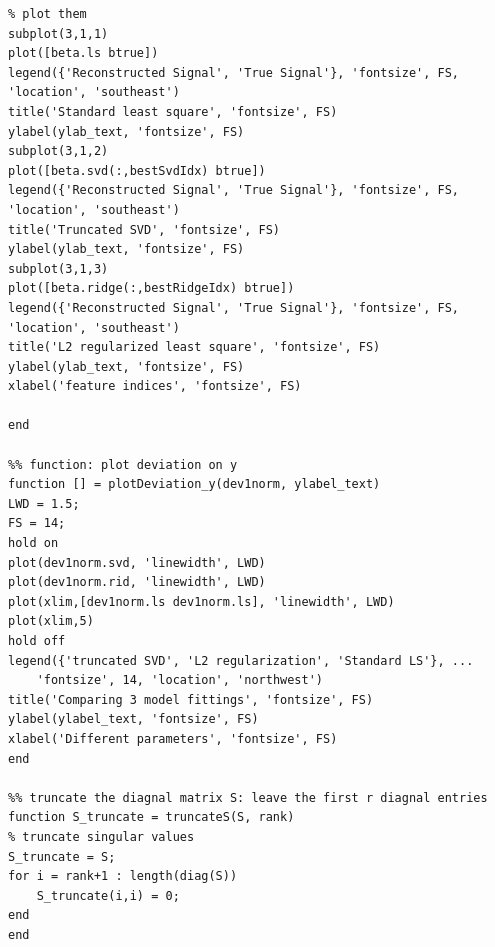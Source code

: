 \documentclass[paper=a4, fontsize=11pt]{scrartcl} %
\numberwithin{equation}{section} %
\numberwithin{figure}{section} %
\numberwithin{table}{section} %
\begin{document}
\begin{lstlisting}
% plot them 
subplot(3,1,1)
plot([beta.ls btrue])
legend({'Reconstructed Signal', 'True Signal'}, 'fontsize', FS, 'location', 'southeast')
title('Standard least square', 'fontsize', FS)
ylabel(ylab_text, 'fontsize', FS)
subplot(3,1,2)
plot([beta.svd(:,bestSvdIdx) btrue])
legend({'Reconstructed Signal', 'True Signal'}, 'fontsize', FS, 'location', 'southeast')
title('Truncated SVD', 'fontsize', FS)
ylabel(ylab_text, 'fontsize', FS)
subplot(3,1,3)
plot([beta.ridge(:,bestRidgeIdx) btrue])
legend({'Reconstructed Signal', 'True Signal'}, 'fontsize', FS, 'location', 'southeast')
title('L2 regularized least square', 'fontsize', FS)
ylabel(ylab_text, 'fontsize', FS)
xlabel('feature indices', 'fontsize', FS)

end

%% function: plot deviation on y
function [] = plotDeviation_y(dev1norm, ylabel_text)
LWD = 1.5;
FS = 14;
hold on
plot(dev1norm.svd, 'linewidth', LWD)
plot(dev1norm.rid, 'linewidth', LWD)
plot(xlim,[dev1norm.ls dev1norm.ls], 'linewidth', LWD)
plot(xlim,5)
hold off
legend({'truncated SVD', 'L2 regularization', 'Standard LS'}, ...
    'fontsize', 14, 'location', 'northwest')
title('Comparing 3 model fittings', 'fontsize', FS)
ylabel(ylabel_text, 'fontsize', FS)
xlabel('Different parameters', 'fontsize', FS)
end

%% truncate the diagnal matrix S: leave the first r diagnal entries
function S_truncate = truncateS(S, rank)
% truncate singular values
S_truncate = S;
for i = rank+1 : length(diag(S))
    S_truncate(i,i) = 0;
end
end
\end{lstlisting}
\end{document}
